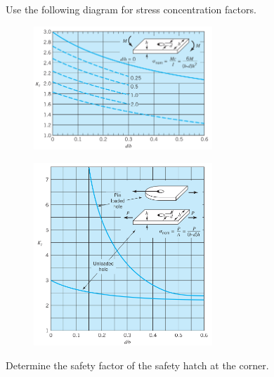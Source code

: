 \documentclass[
10pt,
a4paper,
openany,
svgnames,
]{book}
\begin{document}
\begin{example}
  Use the following diagram for stress concentration factors.

  \begin{figure}[H]
    \centering
    \includegraphics[width=0.6\textwidth]{pictures/Static-body-load-analysis/stress-conc-bending-plate}
  \end{figure}
  \begin{figure}[H]
    \centering
    \includegraphics[width=0.6\textwidth]{pictures/Static-body-load-analysis/stress-conc-axial-plate}
  \end{figure}

  Determine the safety factor of the safety hatch at the corner.
\end{example}
\end{document}
